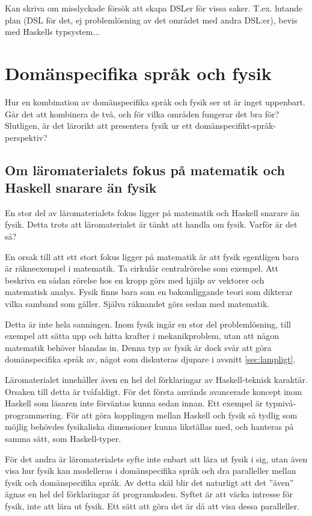 \begin{binge}
Kan skriva om misslyckade försök att skapa DSLer för vissa saker. T.ex. lutande plan (DSL för det, ej problemlösning av det området med andra DSL:er), bevis med Haskells typsystem...

\section{Domänspecifika språk och fysik}

Hur en kombination av domänspecifika språk och fysik ser ut är inget uppenbart. Går det att kombinera de två, och för vilka områden fungerar det bra för? Slutligen, är det lärorikt att presentera fysik ur ett domänspecifikt-språk-perspektiv?

\subsection{Om läromaterialets fokus på matematik och Haskell snarare än fysik}

En stor del av läromaterialets fokus ligger på matematik och Haskell snarare än
fysik. Detta trots att läromaterialet är tänkt att handla om fysik. Varför är
det så?

En orsak till att ett stort fokus ligger på matematik är att fysik egentligen
bara är räkneexempel i matematik. Ta cirkulär centralrörelse som exempel. Att
beskriva en sådan rörelse hos en kropp görs med hjälp av vektorer och
matematisk analys. Fysik finns bara som en bakomliggande teori som dikterar
vilka samband som gäller. Själva räknandet görs sedan med matematik.

Detta är inte hela sanningen. Inom fysik ingår en stor del problemlösning, till
exempel att sätta upp och hitta krafter i mekanikproblem, utan att någon
matematik behöver blandas in. Denna typ av fysik är dock svår att göra
domänspecifika språk av, något som diskuteras djupare i avsnitt
\ref{sec:lampligt}.

Läromaterialet innehåller även en hel del förklaringar av Haskell-teknisk
karaktär. Orsaken till detta är tvåfaldigt. För det första
används avancerade koncept inom Haskell som läsaren inte förväntas kunna sedan
innan. Ett exempel är typnivå-programmering. För att göra kopplingen mellan
Haskell och fysik så tydlig som möjlig behövdes fysikaliska dimensioner kunna
likställas med, och hanteras på samma sätt, som Haskell-typer.

För det andra är läromaterialets syfte inte enbart att lära ut fysik i sig,
utan även visa hur fysik kan modelleras i domänspecifika språk och dra
paralleller mellan fysik och domänspecifika språk. Av detta skäl blir det
naturligt att det ''även'' ägnas en hel del förklaringar åt programkoden.
Syftet är att väcka intresse för fysik, inte att lära ut fysik. Ett sätt att
göra det är då att visa dessa paralleller.


\end{binge}
